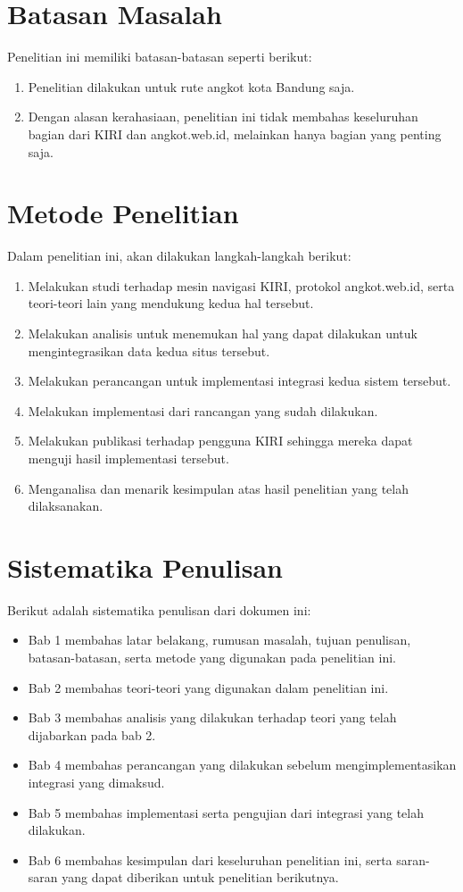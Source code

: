 \section{Batasan Masalah}
\label{sec:batasan_masalah}
Penelitian ini memiliki batasan-batasan seperti berikut:
\begin{enumerate}
	\item Penelitian dilakukan untuk rute angkot kota Bandung saja.
	\item Dengan alasan kerahasiaan, penelitian ini tidak membahas keseluruhan bagian dari KIRI dan angkot.web.id, melainkan hanya bagian yang penting saja.
\end{enumerate}

\section{Metode Penelitian}
\label{sec:metode_penelitian}
Dalam penelitian ini, akan dilakukan langkah-langkah berikut:
\begin{enumerate}
	\item Melakukan studi terhadap mesin navigasi KIRI, protokol angkot.web.id, serta teori-teori lain yang mendukung kedua hal tersebut.
	\item Melakukan analisis untuk menemukan hal yang dapat dilakukan untuk mengintegrasikan data kedua situs tersebut.
	\item Melakukan perancangan untuk implementasi integrasi kedua sistem tersebut.
	\item Melakukan implementasi dari rancangan yang sudah dilakukan.
	\item Melakukan publikasi terhadap pengguna KIRI sehingga mereka dapat menguji hasil implementasi tersebut.
	\item Menganalisa dan menarik kesimpulan atas hasil penelitian yang telah dilaksanakan.
\end{enumerate}

\section{Sistematika Penulisan}
\label{sec:sistematika_penulisan}
Berikut adalah sistematika penulisan dari dokumen ini:
\begin{itemize}
	\item Bab 1 membahas latar belakang, rumusan masalah, tujuan penulisan, batasan-batasan, serta metode yang digunakan pada penelitian ini.
	\item Bab 2 membahas teori-teori yang digunakan dalam penelitian ini.
	\item Bab 3 membahas analisis yang dilakukan terhadap teori yang telah dijabarkan pada bab 2.
	\item Bab 4 membahas perancangan yang dilakukan sebelum mengimplementasikan integrasi yang dimaksud.
	\item Bab 5 membahas implementasi serta pengujian dari integrasi yang telah dilakukan.
	\item Bab 6 membahas kesimpulan dari keseluruhan penelitian ini, serta saran-saran yang dapat diberikan untuk penelitian berikutnya.
\end{itemize}